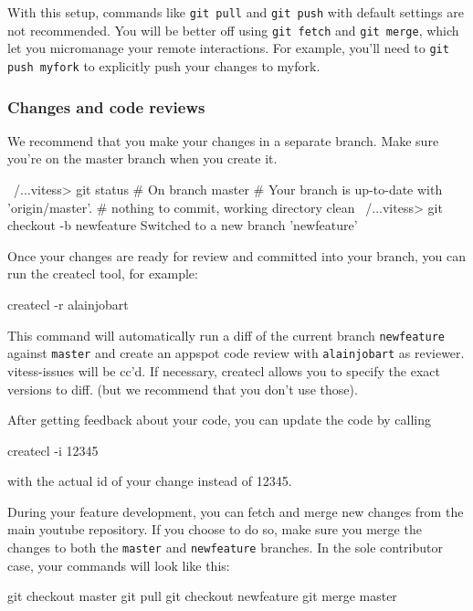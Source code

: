 With this setup, commands like {\tt git pull} and {\tt git push} with default settings
are not recommended. You will be better off using {\tt git fetch} and {\tt git merge},
which let you micromanage your remote interactions. For example, you'll need to
{\tt git push myfork} to explicitly push your changes to myfork.

\subsubsection{Changes and code reviews}\hypertarget{changes-and-code-reviews}{}\label{changes-and-code-reviews}

We recommend that you make your changes in a separate branch.
Make sure you're on the master branch when you create it.

\begin{codesample2}
  ~/...vitess> git status
  # On branch master
  # Your branch is up-to-date with 'origin/master'.
  #
  nothing to commit, working directory clean
  ~/...vitess> git checkout -b newfeature
  Switched to a new branch 'newfeature'
\end{codesample2}

Once your changes are ready for review and committed into your branch,
you can run the createcl tool, for example:
\begin{codesample2}
  createcl -r alainjobart
\end{codesample2}

This command will automatically run a diff of the current branch {\tt newfeature}
against {\tt master} and create an appspot code review with {\tt alainjobart} as
reviewer. vitess-issues will be cc'd. If necessary, createcl allows you to
specify the exact versions to diff. (but we recommend that you don't use those).

After getting feedback about your code, you can update the code by calling


\begin{codesample2}
  createcl -i 12345
\end{codesample2}


with the actual id of your change instead of 12345.

During your feature development, you can fetch and merge new changes from the main youtube repository.
If you choose to do so, make sure you merge the changes to both the {\tt master} and {\tt newfeature} branches.
In the sole contributor case, your commands will look like this:

\begin{codesample2}
  git checkout master
  git pull
  git checkout newfeature
  git merge master
\end{codesample2}




